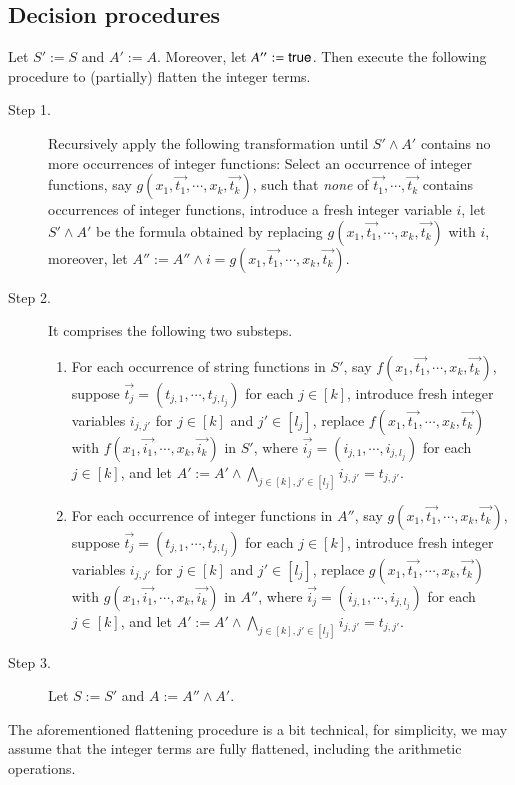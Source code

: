 \subsection{Decision procedures}

Let $S':=S$ and $A':=A$. Moreover, let $A'':= {\sf true}$. Then execute the following procedure to (partially) flatten the integer terms.
\begin{description}
\item[Step 1.] Recursively apply the following transformation until $S' \wedge A'$ contains no more occurrences of integer functions: Select an occurrence of integer functions, say $g(x_1, \vec{t_1}, \cdots, x_k, \vec{t_k})$, such that 
{\it none} of $\vec{t_1}, \cdots, \vec{t_k}$ contains occurrences of integer functions, introduce a fresh integer variable $i$, let $S' \wedge A'$ be the formula obtained by replacing $g(x_1, \vec{t_1}, \cdots, x_k, \vec{t_k})$ with $i$, moreover, let $A'':= A'' \wedge i = g(x_1, \vec{t_1}, \cdots, x_k, \vec{t_k})$.
%
\item[Step 2.] It comprises the following two substeps. 
\begin{enumerate}
\item For each occurrence of string functions in $S'$, say $f(x_1, \vec{t_1}, \cdots, x_k, \vec{t_k})$, suppose $\vec{t_j} = (t_{j,1}, \cdots, t_{j, l_j})$ for each $j \in [k]$, introduce fresh integer variables $i_{j, j'}$ for $j \in [k]$ and $j' \in [l_j]$, replace $f(x_1, \vec{t_1}, \cdots, x_k, \vec{t_k})$ with $f(x_1, \vec{i_1}, \cdots, x_k, \vec{i_k})$ in $S'$, where $\vec{i_j} = (i_{j,1}, \cdots, i_{j, l_j})$ for each $j \in [k]$, and let $A':=A' \wedge \bigwedge \limits_{j \in [k], j' \in [l_j]} i_{j, j'} = t_{j, j'}$. 
\item For each occurrence of integer functions in $A''$, say $g(x_1, \vec{t_1}, \cdots, x_k, \vec{t_k})$, suppose $\vec{t_j} = (t_{j,1}, \cdots, t_{j, l_j})$ for each $j \in [k]$, introduce fresh integer variables $i_{j, j'}$ for $j \in [k]$ and $j' \in [l_j]$, replace $g(x_1, \vec{t_1}, \cdots, x_k, \vec{t_k})$ with $g(x_1, \vec{i_1}, \cdots, x_k, \vec{i_k})$ in $A''$, where $\vec{i_j} = (i_{j,1}, \cdots, i_{j, l_j})$ for each $j \in [k]$, and let $A':=A' \wedge \bigwedge \limits_{j \in [k], j' \in [l_j]} i_{j, j'} = t_{j, j'}$. 
\end{enumerate}
%
\item[Step 3.] Let $S:=S'$ and $A:=A'' \wedge A' $.
\end{description}
The aforementioned flattening procedure is a bit technical, for simplicity, we may assume that the integer terms are fully flattened, including the arithmetic operations.

